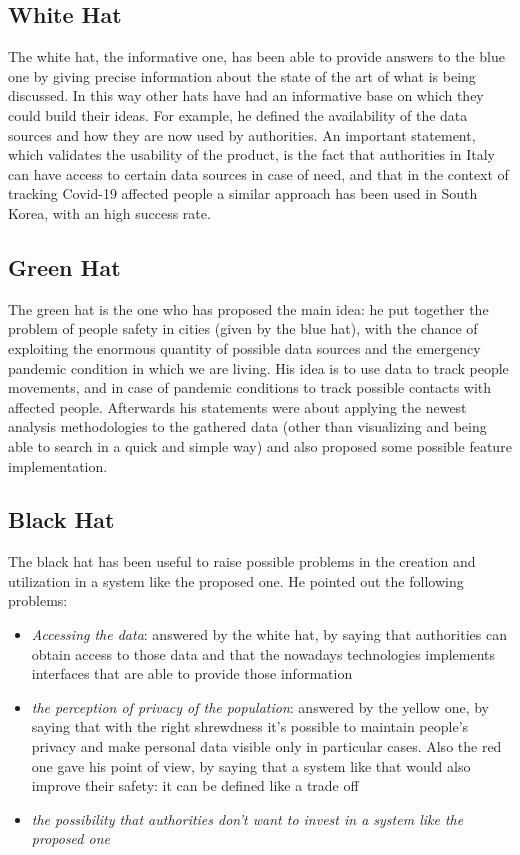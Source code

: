 \documentclass[../main.tex]{subfiles}
\begin{document}
    \subsection{White Hat}\label{subsec:white-hat}
    The white hat, the informative one, has been able to provide answers to the blue one by giving precise information about the state of the art of what is being discussed.
    In this way other hats have had an informative base on which they could build their ideas.
    For example, he defined the availability of the data sources and how they are now used by authorities.
    An important statement, which validates the usability of the product, is the fact that authorities in Italy can have access to certain data sources in case of need,
    and that in the context of tracking Covid-19 affected people a similar approach has been used in South Korea, with an high success rate.
    \subsection{Green Hat}\label{subsec:green-hat}
    The green hat is the one who has proposed the main idea: he put together the problem of people safety in cities (given by the blue hat), with the chance
    of exploiting the enormous quantity of possible data sources and the emergency pandemic condition in which we are living.
    His idea is to use data to track people movements, and in case of pandemic conditions to track possible contacts with affected people.
    Afterwards his statements were about applying the newest analysis methodologies to the gathered data (other than visualizing and being able to search in
    a quick and simple way) and also proposed some possible feature implementation.

    \subsection{Black Hat}\label{subsec:black-hat}
    The black hat has been useful to raise possible problems in the creation and utilization in a system like the proposed one. He pointed out the following problems:
    \begin{itemize}
        \item \textit{Accessing the data}: answered by the white hat, by saying that authorities can obtain access to those data and that the nowadays technologies
        implements interfaces that are able to provide those information
        \item \textit{the perception of privacy of the population}: answered by the yellow one, by saying that with the right shrewdness
        it’s possible to maintain people's privacy and make personal data visible only in particular cases.
        Also the red one gave his point of view, by saying that a system like that would also improve their safety: it can be defined like a trade off
        \item \textit{the possibility that authorities don’t want to invest in a system like the proposed one}
    \end{itemize}
\end{document}
